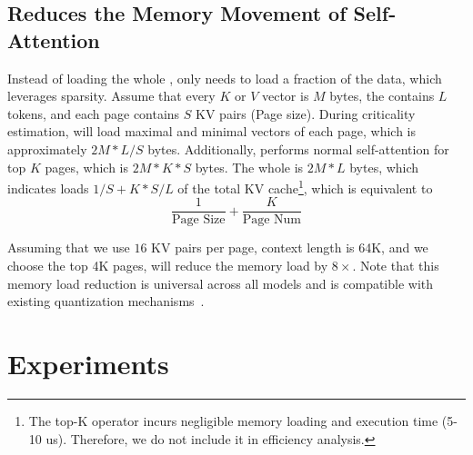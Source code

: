 \subsection{\method Reduces the Memory Movement of Self-Attention}

Instead of loading the whole \kvc{}, \method{} only needs to load a fraction of the data, which leverages \qaware{} sparsity. Assume that every $K$ or $V$ vector is $M$ bytes, the \kvc{} contains $L$ tokens, and each page contains $S$ KV pairs (Page size). During criticality estimation, \method will load maximal and minimal vectors of each page, which is approximately $2M*L/S$ bytes. Additionally, \method performs normal self-attention for top $K$ pages, which is $2M*K*S$ bytes. The whole \kvc{} is $2M*L$ bytes, which indicates \method loads $1/S + K*S/L$ of the total KV cache\footnote{The top-K operator incurs negligible memory loading and execution time (5-10 us). Therefore, we do not include it in efficiency analysis. }, which is equivalent to 
$$
\frac{1}{\text{Page Size}} + \frac{K}{\text{Page Num}}
$$

Assuming that we use $16$ KV pairs per page, context length is 64K, and we choose the top 4K pages, \method will reduce the memory load by $8\times$. Note that this memory load reduction is universal across all models and is compatible with existing quantization mechanisms~\cite{zhao2023atom}.

\section{Experiments}

